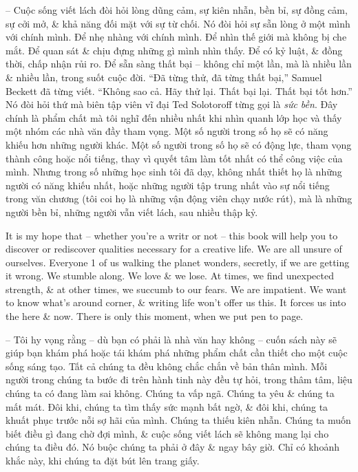 \documentclass{article}
\begin{document}
\begin{itemize}
	-- Cuộc sống viết lách đòi hỏi lòng dũng cảm, sự kiên nhẫn, bền bỉ, sự đồng cảm, sự cởi mở, \& khả năng đối mặt với sự từ chối. Nó đòi hỏi sự sẵn lòng ở một mình với chính mình. Để nhẹ nhàng với chính mình. Để nhìn thế giới mà không bị che mắt. Để quan sát \& chịu đựng những gì mình nhìn thấy. Để có kỷ luật, \& đồng thời, chấp nhận rủi ro. Để sẵn sàng thất bại -- không chỉ một lần, mà là nhiều lần \& nhiều lần, trong suốt cuộc đời. ``Đã từng thử, đã từng thất bại,'' {\sc Samuel Beckett} đã từng viết. ``Không sao cả. Hãy thử lại. Thất bại lại. Thất bại tốt hơn.'' Nó đòi hỏi thứ mà biên tập viên vĩ đại {\sc Ted Solotoroff} từng gọi là {\it sức bền}. Đây chính là phẩm chất mà tôi nghĩ đến nhiều nhất khi nhìn quanh lớp học và thấy một nhóm các nhà văn đầy tham vọng. Một số người trong số họ sẽ có năng khiếu hơn những người khác. Một số người trong số họ sẽ có động lực, tham vọng thành công hoặc nổi tiếng, thay vì quyết tâm làm tốt nhất có thể công việc của mình. Nhưng trong số những học sinh tôi đã dạy, không nhất thiết họ là những người có năng khiếu nhất, hoặc những người tập trung nhất vào sự nổi tiếng trong văn chương (tôi coi họ là những vận động viên chạy nước rút), mà là những người bền bỉ, những người vẫn viết lách, sau nhiều thập kỷ.
	
	It is my hope that -- whether you're a writr or not -- this book will help you to discover or rediscover qualities necessary for a creative life. We are all unsure of ourselves. Everyone 1 of us walking the planet wonders, secretly, if we are getting it wrong. We stumble along. We love \& we lose. At times, we find unexpected strength, \& at other times, we succumb to our fears. We are impatient. We want to know what's around corner, \& writing life won't offer us this. It forces us into the here \& now. There is only this moment, when we put pen to page.
	
	-- Tôi hy vọng rằng -- dù bạn có phải là nhà văn hay không -- cuốn sách này sẽ giúp bạn khám phá hoặc tái khám phá những phẩm chất cần thiết cho một cuộc sống sáng tạo. Tất cả chúng ta đều không chắc chắn về bản thân mình. Mỗi người trong chúng ta bước đi trên hành tinh này đều tự hỏi, trong thâm tâm, liệu chúng ta có đang làm sai không. Chúng ta vấp ngã. Chúng ta yêu \& chúng ta mất mát. Đôi khi, chúng ta tìm thấy sức mạnh bất ngờ, \& đôi khi, chúng ta khuất phục trước nỗi sợ hãi của mình. Chúng ta thiếu kiên nhẫn. Chúng ta muốn biết điều gì đang chờ đợi mình, \& cuộc sống viết lách sẽ không mang lại cho chúng ta điều đó. Nó buộc chúng ta phải ở đây \& ngay bây giờ. Chỉ có khoảnh khắc này, khi chúng ta đặt bút lên trang giấy.
	

\end{itemize}
\end{document}
